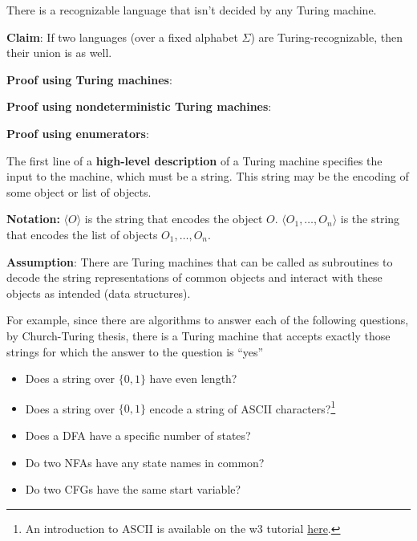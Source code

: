 \documentclass[12pt, oneside]{article}
\begin{document}
There is a recognizable language that isn't decided by any Turing machine.

\vfill

\newpage


{\bf Claim}: If two languages  (over a fixed alphabet  $\Sigma$) are Turing-recognizable, then  their union  is  as well.

{\bf Proof using Turing machines}:

\vfill

{\bf Proof using nondeterministic Turing machines}: 

\vfill  

{\bf  Proof using enumerators}:

\vfill

\newpage


The first line of a {\bf high-level description} of a Turing machine specifies the input to the machine, which must be a string.
This string may be the encoding of some object or  list of  objects.  

{\bf Notation:} $\langle O \rangle$ is the string that encodes the object $O$.
$\langle O_1, \ldots, O_n \rangle$ is the string that encodes the list of objects $O_1, \ldots, O_n$.

{\bf Assumption}: There are Turing  machines that can be called as subroutines
to decode the string representations of common objects and  interact with these objects as intended
(data structures).
  
For example, since there are algorithms to answer each of the following questions,
by Church-Turing thesis, there is a Turing machine that accepts exactly those strings for which the 
answer to the question is ``yes''
\begin{itemize}
    \item Does a string over $\{0,1\}$ have even length?

    \vfill

    \item Does a string over $\{0,1\}$ encode a string of ASCII characters?\footnote{An introduction to ASCII 
    is available on the w3 tutorial \href{https://www.w3schools.com/charsets/ref_html_ascii.asp}{here}.}

    \vfill

    \item Does a DFA have a specific number of states?

    \vfill

    \item Do two NFAs have any state names in common?

    \vfill

    \item Do two CFGs have the same start variable?

    \vfill

  \end{itemize}
\end{document}
